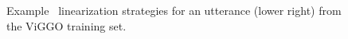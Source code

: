 \begin{figure}
\begin{tikzpicture}[]
\end{tikzpicture}

\caption{Example \meaningrepresentation~linearization strategies for an utterance (lower right) from the 
    ViGGO training set.}
\label{fig:linstrats}
\end{figure}
